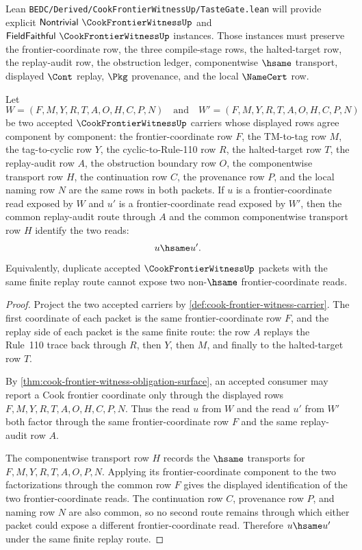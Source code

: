 Lean \texttt{BEDC/Derived/CookFrontierWitnessUp/TasteGate.lean} will provide explicit $\mathsf{Nontrivial}\ \CookFrontierWitnessUp$ and $\mathsf{FieldFaithful}\ \CookFrontierWitnessUp$ instances. Those instances must preserve the frontier-coordinate row, the three compile-stage rows, the halted-target row, the replay-audit row, the obstruction ledger, componentwise $\hsame$ transport, displayed $\Cont$ replay, $\Pkg$ provenance, and the local $\NameCert$ row.


\begin{lemma}
\label{lem:cook-frontier-witness-replay-audit-route-determinacy}
Let
$$
W=(F,M,Y,R,T,A,O,H,C,P,N)
\quad\text{and}\quad
W'=(F,M,Y,R,T,A,O,H,C,P,N)
$$
be two accepted $\CookFrontierWitnessUp$ carriers whose displayed rows agree component by component: the frontier-coordinate row $F$, the TM-to-tag row $M$, the tag-to-cyclic row $Y$, the cyclic-to-Rule-110 row $R$, the halted-target row $T$, the replay-audit row $A$, the obstruction boundary row $O$, the componentwise transport row $H$, the continuation row $C$, the provenance row $P$, and the local naming row $N$ are the same rows in both packets. If $u$ is a frontier-coordinate read exposed by $W$ and $u'$ is a frontier-coordinate read exposed by $W'$, then the common replay-audit route through $A$ and the common componentwise transport row $H$ identify the two reads:
$$
u \hsame u'.
$$
Equivalently, duplicate accepted $\CookFrontierWitnessUp$ packets with the same finite replay route cannot expose two non-$\hsame$ frontier-coordinate reads.
\end{lemma}
\begin{proof}
Project the two accepted carriers by \autoref{def:cook-frontier-witness-carrier}. The first coordinate of each packet is the same frontier-coordinate row $F$, and the replay side of each packet is the same finite route: the row $A$ replays the Rule~110 trace back through $R$, then $Y$, then $M$, and finally to the halted-target row $T$.

By \autoref{thm:cook-frontier-witness-obligation-surface}, an accepted consumer may report a Cook frontier coordinate only through the displayed rows $F,M,Y,R,T,A,O,H,C,P,N$. Thus the read $u$ from $W$ and the read $u'$ from $W'$ both factor through the same frontier-coordinate row $F$ and the same replay-audit row $A$.

The componentwise transport row $H$ records the $\hsame$ transports for $F,M,Y,R,T,A,O,P,N$. Applying its frontier-coordinate component to the two factorizations through the common row $F$ gives the displayed identification of the two frontier-coordinate reads. The continuation row $C$, provenance row $P$, and naming row $N$ are also common, so no second route remains through which either packet could expose a different frontier-coordinate read. Therefore $u\hsame u'$ under the same finite replay route.
\end{proof}

